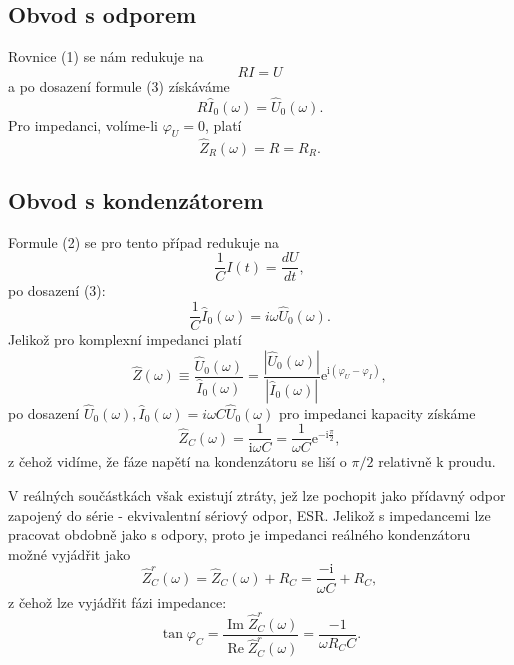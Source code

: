 \documentclass[czech,11pt,a4paper]{article}
\begin{document}
\begin{multicols}{2}
		\subsection{Obvod s odporem}
		Rovnice (1) se nám redukuje na
		\begin{equation}
			R I =U
		\end{equation}
		a po dosazení formule (3) získáváme
		\begin{equation}
			R \hat{I}_{0}(\omega)=\hat{U}_{0}(\omega).
		\end{equation}
		Pro impedanci, volíme-li $\varphi_U = 0$, platí
		\begin{equation}
			\hat{Z}_{R}(\omega)=R=R_{R} .
		\end{equation}
		\subsection{Obvod s kondenzátorem}
		Formule (2) se pro tento případ redukuje na
		\begin{equation}
			\frac 1 C I(t) = \frac{dU}{dt},
		\end{equation}
		po dosazení (3):
		\begin{equation}
			\frac{1}{C} \hat{I}_{0}(\omega) = i \omega \hat{U}_{0}(\omega).
		\end{equation}
		Jelikož pro komplexní impedanci platí
		\begin{equation}
		\hat{Z}(\omega) \equiv \frac{\hat{U}_{0}(\omega)}{\hat{I}_{0}(\omega)}=\frac{\left|\hat{U}_{0}(\omega)\right|}{\left|\hat{I}_{0}(\omega)\right|} \mathrm{e}^{\mathrm{i}\left(\varphi_{U}-\varphi_{I}\right)},
		\end{equation}
		po dosazení $\hat{U}_{0}(\omega), \hat{I}_{0}(\omega) = i \omega  C\hat{U}_{0}(\omega) $ pro impedanci kapacity získáme
		\begin{equation}
			\hat{Z}_{C}(\omega)=\frac{1}{\mathrm{i} \omega C}=\frac{1}{\omega C} \mathrm{e}^{-\mathrm{i} \frac{\pi}{2}},
		\end{equation}
		z čehož vidíme, že fáze napětí na kondenzátoru se liší o $\pi /2$ relativně k proudu.
		
		V reálných součástkách však existují ztráty, jež lze pochopit jako přídavný odpor zapojený do série - ekvivalentní sériový odpor, ESR. Jelikož s impedancemi lze pracovat obdobně jako s odpory, proto je impedanci reálného kondenzátoru možné vyjádřit jako
		\begin{equation}
			\hat{Z}_{C}^{r}(\omega)=\hat{Z}_{C}(\omega)+R_{C}=\frac{-\mathrm{i}}{\omega C}+R_{C},
		\end{equation}
		z čehož lze vyjádřit fázi impedance:
		\begin{equation}
			\tan \varphi_{C}=\frac{\operatorname{Im} \hat{Z}_{C}^{r}(\omega)}{\operatorname{Re} \hat{Z}_{C}^{r}(\omega)}=\frac{-1}{\omega R_{C} C} .
		\end{equation}
		

\end{multicols}
\end{document}
